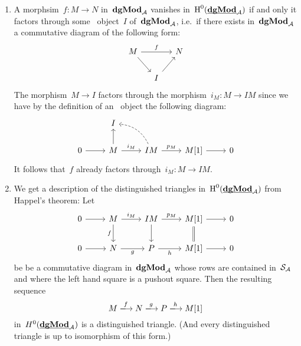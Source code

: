 \documentclass[a4paper,10pt]{scrartcl}
\begin{document}
\begin{enumerate}
  \item
    A morphsim~$f \colon M \to N$ in~$\mathbf{dgMod}_{\mathcal{A}}$ vanishes in~$\operatorname{H}^0(\underline{\smash{\mathbf{dgMod}}}_{\mathcal{A}})$ if and only it factors through some~{\injective{$\Sfrob_{\Acat}$}} object~$I$ of~$\mathbf{dgMod}_{\mathcal{A}}$, i.e.\ if there exists in~$\mathbf{dgMod}_{\mathcal{A}}$ a commutative diagram of the following form:
    \[
      \begin{tikzcd}[column sep = small]
        M
        \arrow{rr}[above]{f}
        \arrow{dr}
        &
        {}
        &
        N
        \\
        {}
        &
        I
        \arrow{ur}
        &
        {}
      \end{tikzcd}
    \]
    The morphism~$M \to I$ factors through the morphism~$i_M \colon M \to IM$ since we have by the definition of an~{\injective{$\Sfrob_{\Acat}$}} object the following diagram:
    \[
      \begin{tikzcd}
        {}
        &
        I
        &
        {}
        &
        {}
        &
        {}
        \\
        0
        \arrow{r}
        &
        M
        \arrow{u}
        \arrow{r}[above]{i_M}
        &
        IM
        \arrow[dashed, bend right]{ul}
        \arrow{r}[above]{p_M}
        &
        M[1]
        \arrow{r}
        &
        0
      \end{tikzcd}
    \]
    It follows that~$f$ already factors through~$i_M \colon M \to IM$.
  \item
    We get a description of the distinguished triangles in~$\operatorname{H}^0(\underline{\smash{\mathbf{dgMod}}}_{\mathcal{A}})$ from Happel’s theorem:
    Let
    \[
      \begin{tikzcd}
        0
        \arrow{r}
        &
        M
        \arrow{r}[above]{i_M}
        \arrow{d}[left]{f}
        &
        IM
        \arrow{r}[above]{p_M}
        \arrow{d}
        &
        M[1]
        \arrow{r}
        \arrow[equal]{d}
        &
        0
        \\
        0
        \arrow{r}
        &
        N
        \arrow{r}[below]{g}
        &
        P
        \arrow{r}[below]{h}
        &
        M[1]
        \arrow{r}
        &
        0
      \end{tikzcd}
    \]
    be be a commutative diagram in~$\mathbf{dgMod}_{\mathcal{A}}$ whose rows are contained in~$\Sfrob_{\Acat}$ and where the left hand square is a pushout square.
    Then the resulting sequence
    \[
      M
      \xlongto{f}
      N
      \xlongto{g}
      P
      \xlongto{h}
      M[1]
    \]
    in~$H^0(\underline{\smash{\mathbf{dgMod}}}_{\mathcal{A}})$ is a distinguished triangle.
    (And every distinguished triangle is up to isomorphism of this form.)
\end{enumerate}
\end{document}
